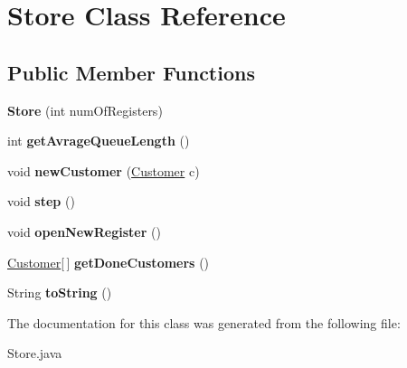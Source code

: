\hypertarget{class_store}{}\section{Store Class Reference}
\label{class_store}
\subsection*{Public Member Functions}
\begin{DoxyCompactItemize}
\item 
\hypertarget{class_store_abafbafd20b647802cebaf5886452cdc0}{}{\bfseries Store} (int num\+Of\+Registers)\label{class_store_abafbafd20b647802cebaf5886452cdc0}

\item 
\hypertarget{class_store_a32ac02ba81771791ee6ba352a3926e53}{}int {\bfseries get\+Avrage\+Queue\+Length} ()\label{class_store_a32ac02ba81771791ee6ba352a3926e53}

\item 
\hypertarget{class_store_a580ef39f7aee7c803d3898a276601e2a}{}void {\bfseries new\+Customer} (\hyperlink{class_customer}{Customer} c)\label{class_store_a580ef39f7aee7c803d3898a276601e2a}

\item 
\hypertarget{class_store_a1e6fc97b6ed42be3a794347fdcf5cec6}{}void {\bfseries step} ()\label{class_store_a1e6fc97b6ed42be3a794347fdcf5cec6}

\item 
\hypertarget{class_store_addbd14e80ff817bdfc73a4f3ca32481f}{}void {\bfseries open\+New\+Register} ()\label{class_store_addbd14e80ff817bdfc73a4f3ca32481f}

\item 
\hypertarget{class_store_a604a8ab9aa543e8f2193d45def608e10}{}\hyperlink{class_customer}{Customer}\mbox{[}$\,$\mbox{]} {\bfseries get\+Done\+Customers} ()\label{class_store_a604a8ab9aa543e8f2193d45def608e10}

\item 
\hypertarget{class_store_a5c6d8363f12a1493a27b4c5ea65aeba5}{}String {\bfseries to\+String} ()\label{class_store_a5c6d8363f12a1493a27b4c5ea65aeba5}

\end{DoxyCompactItemize}


The documentation for this class was generated from the following file\+:\begin{DoxyCompactItemize}
\item 
Store.\+java\end{DoxyCompactItemize}
